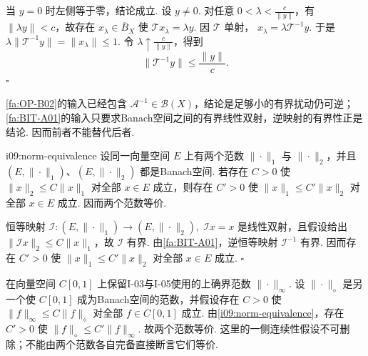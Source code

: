 \begin{FAProof}
当 \(\displaystyle y=0\) 时左侧等于零，结论成立. 设 \(\displaystyle y\neq0\). 对任意
\(\displaystyle 0<\lambda<\frac{c}{\|y\|}\)，有 \(\displaystyle \|\lambda y\|<c\)，故存在 \(\displaystyle x_\lambda\in\overline B_X\) 使 \(\displaystyle \mathcal T x_\lambda=\lambda y\). 因 \(\displaystyle \mathcal T\) 单射，
\(\displaystyle x_\lambda=\lambda\mathcal T^{-1}y\).
于是
\(\displaystyle \lambda\|\mathcal T^{-1}y\|=\|x_\lambda\|\leqslant1\).
令 \(\displaystyle \lambda\uparrow \frac{c}{\|y\|}\)，得到
\[
\|\mathcal T^{-1}y\|\leqslant\frac{\|y\|}{c}.\]
\hfill\(\square\)
\end{FAProof}

\begin{FARemark}[I-05局部稳定性与本章全局定理]
\autoref{fa:OP-B02}的输入已经包含 \(\displaystyle \mathcal A^{-1}\in\mathcal B(X)\)，结论是足够小的有界扰动仍可逆；\autoref{fa:BIT-A01}的输入只要求Banach空间之间的有界线性双射，逆映射的有界性正是结论. 因而前者不能替代后者.
\end{FARemark}

\begin{FACorollary}[B][Banach范数的一侧控制自动升级为等价]{i09:norm-equivalence}
设同一向量空间 \(\displaystyle E\) 上有两个范数 \(\displaystyle \|\cdot\|_1\) 与 \(\displaystyle \|\cdot\|_2\)，并且 \(\displaystyle (E,\|\cdot\|_1)\)、\(\displaystyle (E,\|\cdot\|_2)\) 都是Banach空间. 若存在 \(\displaystyle C>0\) 使
\(\displaystyle \|x\|_2\leqslant C\|x\|_1\)
对全部 \(\displaystyle x\in E\) 成立，则存在 \(\displaystyle C'>0\) 使
\(\displaystyle \|x\|_1\leqslant C'\|x\|_2\)
对全部 \(\displaystyle x\in E\) 成立. 因而两个范数等价.
\end{FACorollary}

\begin{FAProof}
恒等映射
\(\displaystyle \mathcal I:(E,\|\cdot\|_1)\to(E,\|\cdot\|_2), \; \mathcal Ix=x\)
是线性双射，且假设给出 \(\displaystyle \|\mathcal Ix\|_2\leqslant C\|x\|_1\)，故 \(\displaystyle \mathcal I\) 有界. 由\autoref{fa:BIT-A01}，逆恒等映射 \(\displaystyle \mathcal I^{-1}\) 有界. 因而存在 \(\displaystyle C'>0\) 使 \(\displaystyle \|x\|_1\leqslant C'\|x\|_2\) 对全部 \(\displaystyle x\in E\) 成立.
\hfill\(\square\)
\end{FAProof}

\begin{FAExample}[两个Banach范数的等价性]\label{i09:ex-cont-norm-equivalence}
在向量空间 \(\displaystyle C[0,1]\) 上保留I-03与I-05使用的上确界范数 \(\displaystyle \|\cdot\|_\infty\). 设 \(\displaystyle \|\cdot\|_\diamond\) 是另一个使 \(\displaystyle C[0,1]\) 成为Banach空间的范数，并假设存在 \(\displaystyle C>0\) 使
\(\displaystyle \|f\|_\infty\leqslant C\|f\|_\diamond\)
对全部 \(\displaystyle f\in C[0,1]\) 成立. 由\autoref{i09:norm-equivalence}，存在 \(\displaystyle C'>0\) 使
\(\displaystyle \|f\|_\diamond\leqslant C'\|f\|_\infty\).
故两个范数等价. 这里的一侧连续性假设不可删除；不能由两个范数各自完备直接断言它们等价.
\end{FAExample}

